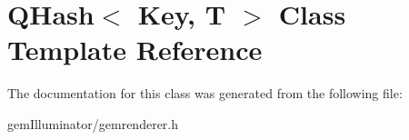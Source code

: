 \hypertarget{class_q_hash}{}\section{Q\+Hash$<$ Key, T $>$ Class Template Reference}
\label{class_q_hash}


The documentation for this class was generated from the following file\+:\begin{DoxyCompactItemize}
\item 
gem\+Illuminator/gemrenderer.\+h\end{DoxyCompactItemize}
